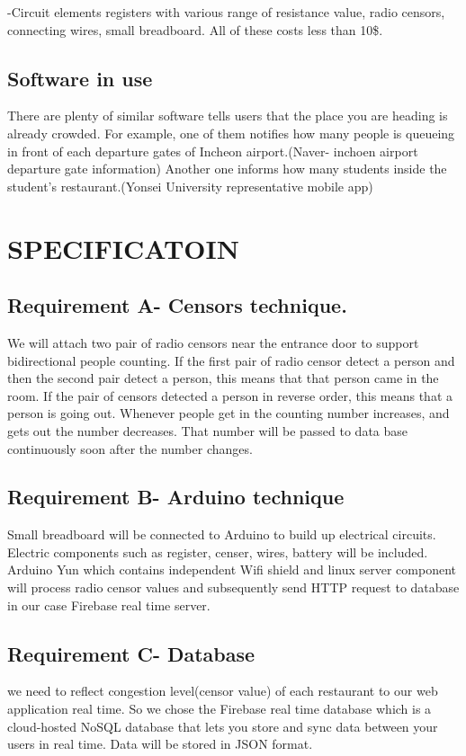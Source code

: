 \documentclass[journal]{IEEEtran}
\begin{document}
-Circuit elements
 registers with various range of resistance value, radio censors, connecting wires, small breadboard. All of these costs less than 10\$.

\subsection{Software in use}
There are plenty of similar software tells users that the place you are heading is already crowded. For example, one of them notifies how many people is queueing in front of each departure gates of Incheon airport.(Naver- inchoen airport departure gate information) Another one informs how many students inside the student’s restaurant.(Yonsei University representative mobile app) 




\section{SPECIFICATOIN}


\subsection{Requirement A- Censors technique.}
We will attach two pair of radio censors near the entrance door to support bidirectional people counting. If the first pair of radio censor detect a person and then the second pair detect a person, this means that that person came in the room. If the pair of censors detected a person in reverse order, this means that a person is going out. Whenever people get in the counting number increases, and gets out the number decreases. That number will be passed to data base continuously soon after the number changes.
\subsection{Requirement B-  Arduino technique}
Small breadboard will be connected to Arduino to build up electrical circuits. Electric components such as register, censer, wires, battery will be included. Arduino Yun which contains independent Wifi shield and linux server component will process radio censor values and subsequently send HTTP request to database in our case Firebase real time server.
\subsection{Requirement C- Database}
we need to reflect congestion level(censor value) of each restaurant to our web application real time. So we chose the Firebase real time database which is a cloud-hosted NoSQL database that lets you store and sync data between your users in real time. Data will be stored in JSON format.
\end{document}
